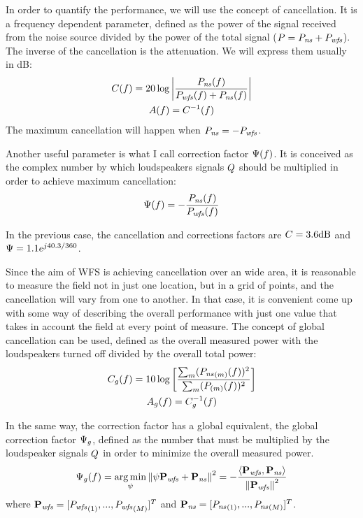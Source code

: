 In order to quantify the performance, we will use the concept of cancellation. It is a frequency dependent parameter, defined as the power of the signal received from the noise source divided by the power of the total signal ($\Field[total][frequency] = \Field[ns][frequency] + \Field[wfs][frequency]$). The inverse of the cancellation is the attenuation. We will express them usually in dB:
\begin{gather}
\cancellation(f) = 20\log{\left\lvert\frac{\Field[ns][frequency](f)}{\Field[wfs][frequency](f) + \Field[ns][frequency](f)}\right\rvert}\\
\attenuation(f) = \cancellation^{-1}(f)
\end{gather}
The maximum cancellation will happen when $\Field[ns][frequency] = -\Field[wfs][frequency]$.

Another useful parameter is what I call correction factor $\correctionFactor(f)$. It is conceived as the complex number by which loudspeakers signals $\signal[wfs][frequency]$ should be multiplied in order to achieve maximum cancellation:
\begin{equation}
\correctionFactor(f) = -\frac{\Field[ns][frequency](f)}{\Field[wfs][frequency](f)}
\end{equation}

In the previous case, the cancellation and corrections factors are $\cancellation = 3.6\si{dB}$ and $\correctionFactor = 1.1 e^{j40.3/360}$.

Since the aim of WFS is achieving cancellation over an wide area, it is reasonable to measure the field not in just one location, but in a grid of points, and the cancellation will vary from one to another. In that case, it is convenient come up with some way of describing the overall performance with just one value that takes in account the field at every point of measure. The concept of global cancellation can be used, defined as the overall measured power with the loudspeakers turned off divided by the overall total power:
\begin{gather}
\globalCancellation(f) = 10 \log \left[\frac{\sum_m (\Field[ns][frequency][scalar][m](f))^2}{\sum_m (\Field[total][frequency][scalar][m](f))^2}\right]
\\
\globalAttenuation(f) = \globalCancellation^{-1}(f)
\end{gather}

In the same way, the correction factor has a global equivalent, the global correction factor $\globalCorrectionFactor$, defined as the number that must be multiplied by the loudspeaker signals $\signal[wfs][frequency]$ in order to minimize the overall measured power.
\begin{equation}
\globalCorrectionFactor(f) = \argmin_{\psi} \norm{\psi \Field[wfs][frequency][vector] + \Field[ns][frequency][vector]}^2 = -\frac{\scalarProd{\Field[wfs][frequency][vector]}{\Field[ns][frequency][vector]}}{\norm{\Field[wfs][frequency][vector]}^2}
\end{equation}
where $\Field[wfs][frequency][vector] = [\Field[wfs][frequency][scalar][1],...,\Field[wfs][frequency][scalar][\numMeasPoints]]^T$ and $\Field[ns][frequency][vector] = [\Field[ns][frequency][scalar][1],...,\Field[ns][frequency][scalar][\numMeasPoints]]^T$.


